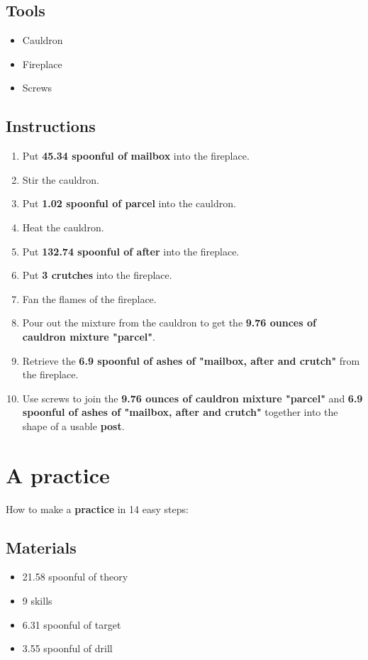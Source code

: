 \documentclass{article}
\begin{document}
\subsection{Tools}\begin{itemize}
\item 
Cauldron
\item 
Fireplace
\item 
Screws
\end{itemize}
\subsection{Instructions}\begin{enumerate}
\item 
Put \textbf{45.34 spoonful of mailbox} into the fireplace.
\item 
Stir the cauldron.
\item 
Put \textbf{1.02 spoonful of parcel} into the cauldron.
\item 
Heat the cauldron.
\item 
Put \textbf{132.74 spoonful of after} into the fireplace.
\item 
Put \textbf{3 crutches} into the fireplace.
\item 
Fan the flames of the fireplace.
\item 
Pour out the mixture from the cauldron to get the \textbf{9.76 ounces of cauldron mixture "parcel"}.
\item 
Retrieve the \textbf{6.9 spoonful of ashes of "mailbox, after and crutch"} from the fireplace.
\item 
Use screws to join the \textbf{9.76 ounces of cauldron mixture "parcel"} and \textbf{6.9 spoonful of ashes of "mailbox, after and crutch"} together into the shape of a usable \textbf{post}.
\end{enumerate}
\newpage
\section{A practice}How to make a \textbf{practice} in 14 easy steps:

\subsection{Materials}\begin{itemize}
\item 
21.58 spoonful of theory
\item 
9 skills
\item 
6.31 spoonful of target
\item 
3.55 spoonful of drill
\end{itemize}
\end{document}
